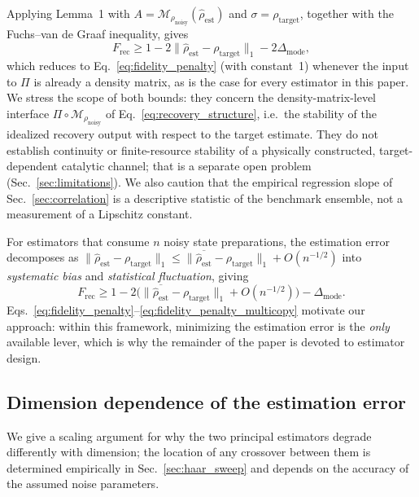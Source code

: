 \documentclass[a4paper,onecolumn]{quantumarticle}
\newcommand{\Frec}{F_\mathrm{rec}}
\newcommand{\rhot}{\rho_\mathrm{target}}
\newcommand{\rhon}{\rho_\mathrm{noisy}}
\newcommand{\rhoe}{\hat{\rho}_\mathrm{est}}
\begin{document}
\noindent Applying Lemma~1 with $A = \mathcal{M}_{\rhon}(\rhoe)$ and $\sigma = \rhot$, together with the Fuchs--van de Graaf inequality, gives
\begin{equation}
\Frec \geq 1 - 2\|\rhoe - \rhot\|_1 - 2\Delta_{\mathrm{mode}},
\label{eq:explicit_bound}
\end{equation}
which reduces to Eq.~\eqref{eq:fidelity_penalty} (with constant~1) whenever the input to $\Pi$ is already a density matrix, as is the case for every estimator in this paper.
We stress the scope of both bounds: they concern the density-matrix-level interface $\Pi \circ \mathcal{M}_{\rhon}$ of Eq.~\eqref{eq:recovery_structure}, i.e.\ the stability of the idealized recovery output with respect to the target estimate.
They do not establish continuity or finite-resource stability of a physically constructed, target-dependent catalytic channel; that is a separate open problem (Sec.~\ref{sec:limitations}).
We also caution that the empirical regression slope of Sec.~\ref{sec:correlation} is a descriptive statistic of the benchmark ensemble, not a measurement of a Lipschitz constant.

For estimators that consume $n$ noisy state preparations, the estimation error decomposes as $\|\rhoe - \rhot\|_1 \leq \|\overline{\rhoe} - \rhot\|_1 + O(n^{-1/2})$ into \emph{systematic bias} and \emph{statistical fluctuation}, giving
\begin{equation}
\Frec \geq 1 - 2\bigl(\|\overline{\rhoe} - \rhot\|_1 + O(n^{-1/2})\bigr) - \Delta_{\mathrm{mode}}.
\label{eq:fidelity_penalty_multicopy}
\end{equation}
Eqs.~\eqref{eq:fidelity_penalty}--\eqref{eq:fidelity_penalty_multicopy} motivate our approach: within this framework, minimizing the estimation error is the \emph{only} available lever, which is why the remainder of the paper is devoted to estimator design.
\label{lemma:lipschitz}


\subsection{Dimension dependence of the estimation error}
\label{sec:crossover_theory}

We give a scaling argument for why the two principal estimators degrade differently with dimension; the location of any crossover between them is determined empirically in Sec.~\ref{sec:haar_sweep} and depends on the accuracy of the assumed noise parameters.
\end{document}

